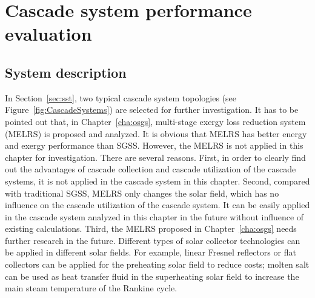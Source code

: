 \chapter{Cascade system performance evaluation}
\section{System description}

In Section~\ref{sec:sst}, two typical cascade system topologies (see Figure~\ref{fig:CascadeSystems}) are selected for further investigation. It has to be pointed out that, in Chapter~\ref{cha:osgs}, multi-stage exergy loss reduction system (MELRS) is proposed and analyzed. It is obvious that MELRS has better energy and exergy performance than SGSS. However, the MELRS is not applied in this chapter for investigation. There are several reasons. First,
in order to clearly find out the advantages of cascade collection and cascade utilization of the cascade systems, it is not applied in the cascade system in this chapter. Second, compared with traditional SGSS, MELRS only changes the solar field, which has no influence on the cascade utilization of the cascade system. It can be easily applied in the cascade system analyzed in this chapter in the future without influence of existing calculations. Third, the MELRS proposed in Chapter~\ref{cha:osgs} needs further research in the future. Different types of solar collector technologies can be applied in different solar fields. For example, linear Fresnel reflectors or flat collectors can be applied for the preheating solar field to reduce costs; molten salt can be used as heat transfer fluid in the superheating solar field to increase the main steam temperature of the Rankine cycle.

